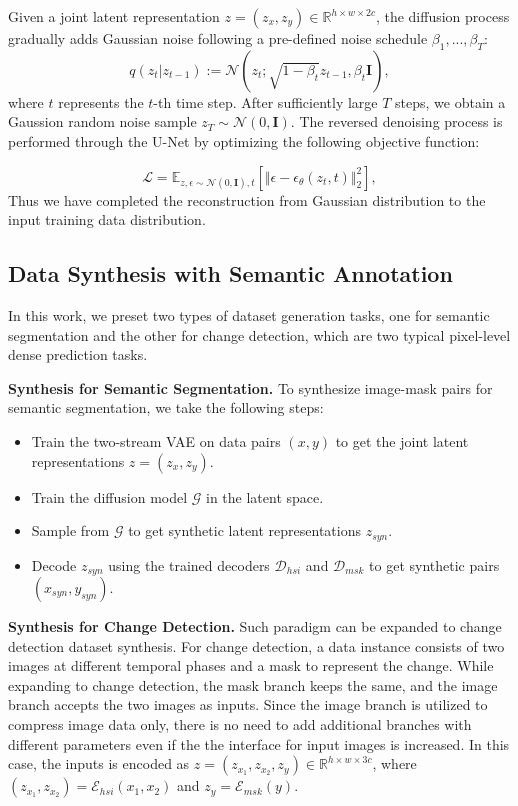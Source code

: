Given a joint latent representation $z = (z_x, z_y) \in\mathbb R^{h\times w\times 2c}$, the diffusion process gradually adds Gaussian noise following a pre-defined noise schedule $\beta_1, . . . , \beta_T$:
\begin{equation}
    q(z_t|z_{t-1}):=\mathcal N(z_t;\sqrt{1-\beta_t}z_{t-1}, \beta_t\mathrm{\mathbf{I}}),
\end{equation}
where $t$ represents the $t$-th time step. After sufficiently large $T$ steps, we obtain a Gaussion random noise sample $z_T\sim \mathcal N(0, \mathrm{\mathbf{I}})$. The reversed denoising process is performed through the U-Net by optimizing the following objective function:

\begin{equation}
    \mathcal L=\mathbb E_{z, \epsilon\sim\mathcal N(0, \mathrm{\mathbf{I}}), t}\left[\Vert {\epsilon - \epsilon_\theta(z_t, t)}\Vert_2^2\right],
\end{equation}
Thus we have completed the reconstruction from Gaussian distribution to the input training data distribution.

\subsection{Data Synthesis with Semantic Annotation}

In this work, we preset two types of dataset generation tasks, one for semantic segmentation and the other for change detection, which are two typical pixel-level dense prediction tasks.

\noindent
\textbf{Synthesis for Semantic Segmentation.}  To synthesize image-mask pairs for semantic segmentation, we take the following steps:

\begin{itemize}
    \item Train the two-stream VAE on data pairs $(x, y)$ to get the joint latent representations $z = (z_x, z_y)$.
    \item Train the diffusion model $\mathcal G$ in the latent space.
    \item Sample from $\mathcal G$ to get synthetic latent representations $z_{syn}$.
    \item Decode $z_{syn}$ using the trained decoders $\mathcal D_{hsi}$ and $\mathcal D_{msk}$ to get synthetic pairs $(x_{syn}, y_{syn})$.
\end{itemize}

\noindent
\textbf{Synthesis for Change Detection.}  Such paradigm can be expanded to change detection dataset synthesis. For change detection, a data instance consists of two images at different temporal phases and a mask to represent the change. While expanding to change detection, the mask branch keeps the same, and the image branch accepts the two images as inputs. Since the image branch is utilized to compress image data only, there is no need to add additional branches with different parameters even if the the interface for input images is increased. In this case, the inputs is encoded as $z = (z_{x_1}, z_{x_2}, z_y)\in\mathbb R^{h\times w\times 3c}$, where $(z_{x_1}, z_{x_2}) = \mathcal E_{hsi}(x_1, x_2)$ and $z_y = \mathcal E_{msk}(y)$.

